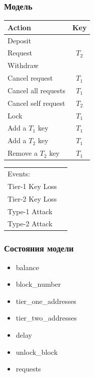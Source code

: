 \documentclass[14pt,aspectratio=169,hyperref={pdftex,unicode},xcolor=dvipsnames]{beamer}
\begin{document}
\begin{frame}[fragile]
\frametitle{Модель}
\begin{multicols}{2}
\begin{center}
\small
\begin{tabular}{ | l | c |}
\hline
Action & Key \\
\hline
Deposit & \\
Request  & $T_2$\\
Withdraw & \\
Cancel request  & $T_1$\\
Cancel all requests  & $T_1$\\
Cancel self request & $T_2$ \\
Lock  & $T_1$ \\
Add a $T_1$ key & $T_1$ \\
Add a $T_2$ key & $T_1$ \\
Remove a $T_2$ key & $T_1$ \\
\hline
\end{tabular}
\end{center}

\begin{center}
\small
\begin{tabular}{ l c }
Events: & \\
Tier-1 Key Loss & \\
Tier-2 Key Loss  & \\
Type-1 Attack & \\
Type-2 Attack & \\

\end{tabular}
\end{center}
\end{multicols}
\end{frame}

\begin{frame}[fragile]
\frametitle{Состояния модели}
\small
\begin{itemize}
    \item balance          
    \item block\_number                    
    \item tier\_one\_addresses             
    \item tier\_two\_addresses              
    \item delay              
    \item unlock\_block 
    \item requests     
\end{itemize}

\end{frame}
\end{document}
